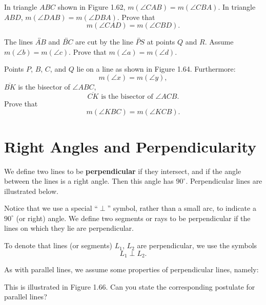 \documentclass[12pt]{book} %
\begin{document}
\begin{ExerciseList}
	
	\Exercise In triangle $ABC$ shown in Figure 1.62, $m(\angle CAB)=m(\angle CBA)$. In triangle $ABD$, $m(\angle DAB)=m(\angle DBA)$. Prove that
	\[
	m(\angle CAD)=m(\angle CBD).
	\]
	
	
	\Exercise The lines $\overleftrightarrow{AB}$ and $\overleftrightarrow{BC}$ are cut by the line $\overleftrightarrow{PS}$ at points $Q$ and $R$. Assume $m(\angle b)=m(\angle c)$. Prove that $m(\angle a)=m(\angle d)$.
	
	
	\Exercise Points $P$, $B$, $C$, and $Q$ lie on a line as shown in Figure 1.64. Furthermore:
	\[
	m(\angle x)=m(\angle y),
	\]
	$\overline{BK}$ is the bisector of $\angle ABC$,
	\[
	\overline{CK}\text{ is the bisector of }\angle ACB.
	\]
	Prove that
	\[
	m(\angle KBC)=m(\angle KCB).
	\]
	
\end{ExerciseList}

\section{Right Angles and Perpendicularity}

We define two lines to be \textbf{perpendicular} if they intersect, and if the angle between the lines is a right angle. Then this angle has $90^\circ$. Perpendicular lines are illustrated below.


Notice that we use a special ``$\perp$'' symbol, rather than a small arc, to indicate a $90^\circ$ (or right) angle. We define two segments or rays to be perpendicular if the lines on which they lie are perpendicular.

To denote that lines (or segments) $L_1$, $L_2$ are perpendicular, we use the symbols
\[
L_1\perp L_2.
\]

As with parallel lines, we assume some properties of perpendicular lines, namely:


This is illustrated in Figure 1.66. Can you state the corresponding postulate for parallel lines?

\end{document}
